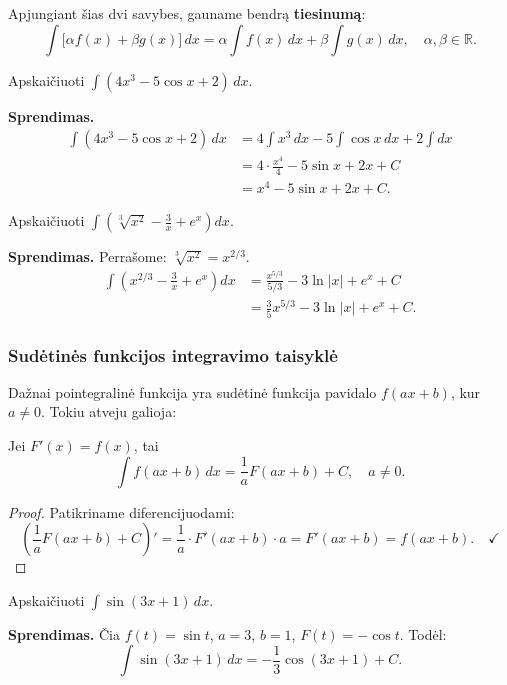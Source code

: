 Apjungiant šias dvi savybes, gauname bendrą \textbf{tiesinumą}:
\[
\int \bigl[\alpha f(x)+\beta g(x)\bigr]\,dx = \alpha\int f(x)\,dx + \beta\int g(x)\,dx, \quad \alpha,\beta\in\mathbb{R}.
\]

\begin{example}
Apskaičiuoti $\displaystyle\int (4x^3 - 5\cos x + 2)\,dx$.

\textbf{Sprendimas.}
\begin{align*}
\int (4x^3 - 5\cos x + 2)\,dx
&= 4\int x^3\,dx - 5\int \cos x\,dx + 2\int dx \\
&= 4\cdot\frac{x^4}{4} - 5\sin x + 2x + C \\
&= x^4 - 5\sin x + 2x + C.
\end{align*}
\end{example}

\begin{example}
Apskaičiuoti $\displaystyle\int \left(\sqrt[3]{x^2} - \frac{3}{x} + e^x\right)dx$.

\textbf{Sprendimas.} Perrašome: $\sqrt[3]{x^2}=x^{2/3}$.
\begin{align*}
\int \left(x^{2/3} - \frac{3}{x}+e^x\right)dx
&= \frac{x^{5/3}}{5/3} - 3\ln|x| + e^x + C \\
&= \frac{3}{5}x^{5/3} - 3\ln|x| + e^x + C.
\end{align*}
\end{example}

\subsubsection{Sudėtinės funkcijos integravimo taisyklė}

Dažnai pointegralinė funkcija yra sudėtinė funkcija pavidalo $f(ax+b)$, kur $a\neq 0$. Tokiu atveju galioja:

\begin{theorem}
Jei $F'(x)=f(x)$, tai
\[
\int f(ax+b)\,dx = \frac{1}{a}F(ax+b)+C, \quad a\neq 0.
\]
\end{theorem}

\begin{proof}
Patikriname diferencijuodami:
\[
\left(\frac{1}{a}F(ax+b)+C\right)' = \frac{1}{a}\cdot F'(ax+b)\cdot a = F'(ax+b)=f(ax+b).\quad\checkmark
\]
\end{proof}

\begin{example}
Apskaičiuoti $\displaystyle\int \sin(3x+1)\,dx$.

\textbf{Sprendimas.} Čia $f(t)=\sin t$, $a=3$, $b=1$, $F(t)=-\cos t$. Todėl:
\[
\int \sin(3x+1)\,dx = -\frac{1}{3}\cos(3x+1)+C.
\]
\end{example}

